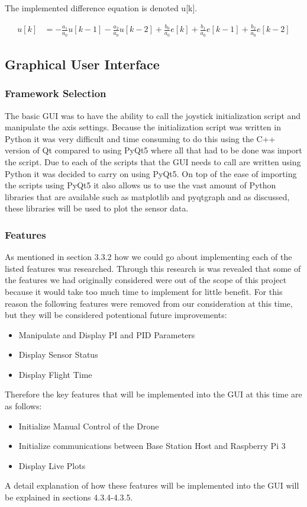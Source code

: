 The implemented difference equation is denoted u[k].

\begin{align*}
u[k] & = -\frac{a_1}{a_0} u[k-1] - \frac{a_2}{a_0} u[k-2] + \frac{b_0}{a_0} e[k] +\frac{b_1}{a_0} e[k-1] +\frac{b_2}{a_0} e[k-2]  
\end{align*}


\subsection{Graphical User Interface}
\subsubsection{Framework Selection}
The basic GUI was to have the ability to call the joystick initialization script and manipulate the axis settings. Because the initialization script was written in Python it was very difficult and time consuming to do this using the C++ version of Qt compared to using PyQt5 where all that had to be done was import the script. Due to each of the scripts that the GUI needs to call are written using Python it was decided to carry on using PyQt5. On top of the ease of importing the scripts using PyQt5 it also allows us to use the vast amount of Python libraries that are available such as matplotlib and pyqtgraph and as discussed, these libraries will be used to plot the sensor data. 
\subsubsection{Features}
As mentioned in section 3.3.2 how we could go about implementing each of the listed features was researched. Through this research is was revealed that some of the features we had originally considered were out of the scope of this project because it would take too much time to implement for little benefit. For this reason the following features were removed from our consideration at this time, but they will be considered potentional future improvements: 
\begin{itemize}
	\item Manipulate and Display PI and PID Parameters
	\item Display Sensor Status
	\item Display Flight Time
\end{itemize}
Therefore the key features that will be implemented into the GUI at this time are as follows:
\begin{itemize}
	\item Initialize Manual Control of the Drone
	\item Initialize communications between Base Station Host and Raspberry Pi 3
	\item Display Live Plots
\end{itemize}
A detail explanation of how these features will be implemented into the GUI will be explained in sections 4.3.4-4.3.5.
